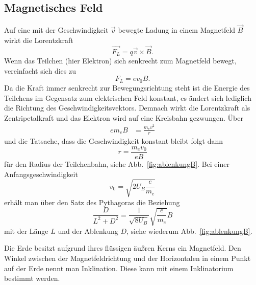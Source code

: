 \subsection{Magnetisches Feld}
Auf eine mit der Geschwindigkeit $\vec v$ bewegte Ladung in einem Magnetfeld $\vec B$ wirkt die Lorentzkraft
\begin{equation}
  \vec {F_L} = q \vec v \times \vec B.
\end{equation}
Wenn das Teilchen (hier Elektron) sich senkrecht zum Magnetfeld bewegt, vereinfacht sich dies zu
\begin{equation}
  F_L = e v_0 B.
\end{equation}
Da die Kraft immer senkrecht zur Bewegungsrichtung steht ist die Energie des Teilchens im Gegensatz zum elektrischen Feld konstant, es ändert sich lediglich die Richtung des Geschwindigkeitsvektors. Demnach wirkt die Lorentzkraft als Zentripetalkraft und das Elektron wird auf eine Kreisbahn gezwungen. Über
\begin{align}
  e m_e B &= \frac{m_e v^2}{r}
\end{align}
und die Tatsache, dass die Geschwindigkeit konstant bleibt folgt dann
\begin{equation}
  r = \frac{m_e v_0}{e B}
\end{equation}
für den Radius der Teilchenbahn, siehe Abb.~\ref{fig:ablenkungB}.
Bei einer Anfangsgeschwindigkeit
\begin{equation}
  v_0 = \sqrt{2 U_B \frac{e}{m_e}}
\end{equation}
erhält man über den Satz des Pythagoras die Beziehung
\begin{equation}
  \label{eqn:spez}
  \frac{D}{L^2 + D^2} = \frac{1}{\sqrt{8 U_B}} \sqrt{\frac{e}{m_e}} B
\end{equation}
mit der Länge $L$ und der Ablenkung $D$, siehe wiederum Abb.~\ref{fig:ablenkungB}.

Die Erde besitzt aufgrund ihres flüssigen äußren Kerns ein Magnetfeld. Den Winkel zwischen der Magnetfeldrichtung und der Horizontalen in einem Punkt auf der Erde nennt man Inklination. Diese kann mit einem Inklinatorium bestimmt werden.
